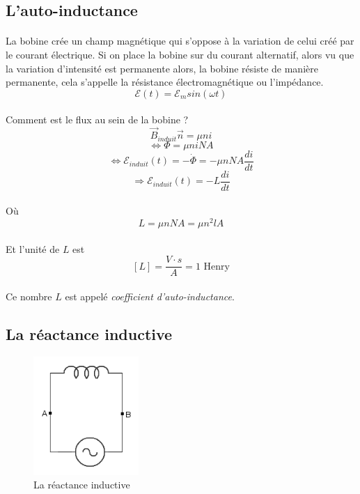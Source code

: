 \documentclass[a4paper]{article}
\begin{document}
\subsection{L'auto-inductance}
\paragraph{}La bobine crée un champ magnétique qui s'oppose à la variation de celui créé par le courant électrique. Si on place la bobine sur du courant alternatif, alors vu que la variation d'intensité est permanente alors, la bobine résiste de manière permanente, cela s'appelle la résistance électromagnétique ou l'impédance.
\[\mathscr{E}(t)=\mathscr{E}_msin(\omega t)\]
\paragraph{}Comment est le flux au sein de la bobine ?
\[\vec{B}_{induit}\vec{n}=\mu n i\]
\[\Leftrightarrow \Phi=\mu niNA\]
\[\Leftrightarrow \mathscr{E}_{induit}(t)=-\dot{\Phi}=-\mu nNA\frac{di}{dt}\]
\[\Rightarrow \mathscr{E}_{induit}(t)=-L\frac{di}{dt}\]
\paragraph{}Où
\[L=\mu nNA=\mu n^2lA\]
\paragraph{}Et l'unité de $L$ est
\[[L]=\frac{V\cdot s}{A}=1\text{ Henry}\]
\paragraph{}Ce nombre $L$ est appelé \textit{coefficient d'auto-inductance}.
\subsection{La réactance inductive}
\begin{figure}
\begin{center}
\includegraphics[width=4cm]{imgs/em_1.png}
\end{center}
\caption{La réactance inductive}
\label{La réactance inductive}
\end{figure}
\end{document}
